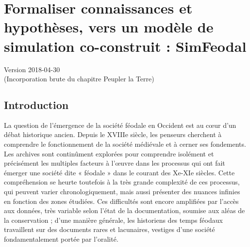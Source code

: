 \documentclass[12pt, a4paper, oneside]{book}
\begin{document}
	\setcounter{part}{0}
	\setcounter{chapter}{1}
	\setcounter{secnumdepth}{4}
	
	\chapter{Formaliser connaissances et hypothèses, vers un modèle de simulation co-construit : SimFeodal}
	\begin{center}
		{\large Version 2018-04-30\\
			(Incorporation brute du chapitre Peupler la Terre)}
	\end{center}
	
	\section{Introduction}
	
	La question de l'émergence de la société féodale en Occident est au cœur d'un débat historique ancien.
	Depuis le XVIIIe siècle, les penseurs cherchent à comprendre le fonctionnement de la société médiévale et à cerner ses fondements.
	Les archives sont continûment explorées pour comprendre isolément et précisément les multiples facteurs à l'œuvre dans les processus qui ont fait émerger une société dite « féodale » dans le courant des Xe-XIe siècles.
	Cette compréhension se heurte toutefois à la très grande complexité de ces processus, qui peuvent varier chronologiquement, mais aussi présenter des nuances infinies en fonction des zones étudiées.
	Ces difficultés sont encore amplifiées par l'accès aux données, très variable selon l'état de la documentation, soumise aux aléas de la conservation ; d'une manière générale, les historiens des temps féodaux travaillent sur des documents rares et lacunaires, vestiges d'une société fondamentalement portée par l'oralité.
	
\end{document}
